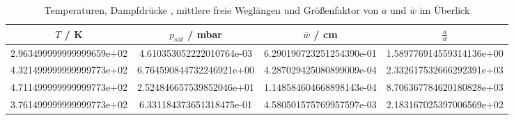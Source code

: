 \begin{table}
  \centering
  \caption{Temperaturen, Dampfdrücke , mittlere freie Weglängen und Größenfaktor von
  \texorpdfstring{$a$}{math} und \texorpdfstring{$\bar{w}$}{math} im Überlick }
  \begin{tabular}{S[scientific-notation = fixed , fixed-exponent = 0] S S S[scientific-notation = fixed , fixed-exponent = 0]}
    \toprule
    $T$ / \si{\kelvin} & $p_{sät}$ / \si{\milli \bar} & $\bar{w}$ / \si{\centi \meter} & $\frac{a}{\bar{w}} $ \\
    \midrule
    2.963499999999999659e+02 & 4.610353052222010764e-03 & 6.290190723251254390e-01 & 1.589776914559314136e+00\\
    4.321499999999999773e+02 & 6.764590844732246921e+00 & 4.287029425080899009e-04 & 2.332617532666292391e+03\\
    4.711499999999999773e+02 & 2.524846657539852046e+01 & 1.148584604668898143e-04 & 8.706367784620180828e+03\\
    3.761499999999999773e+02 & 6.331184373651318475e-01 & 4.580501575769957597e-03 & 2.183167025397006569e+02\\
    \bottomrule
  \end{tabular}
  \label{tab:ue}
\end{table}
